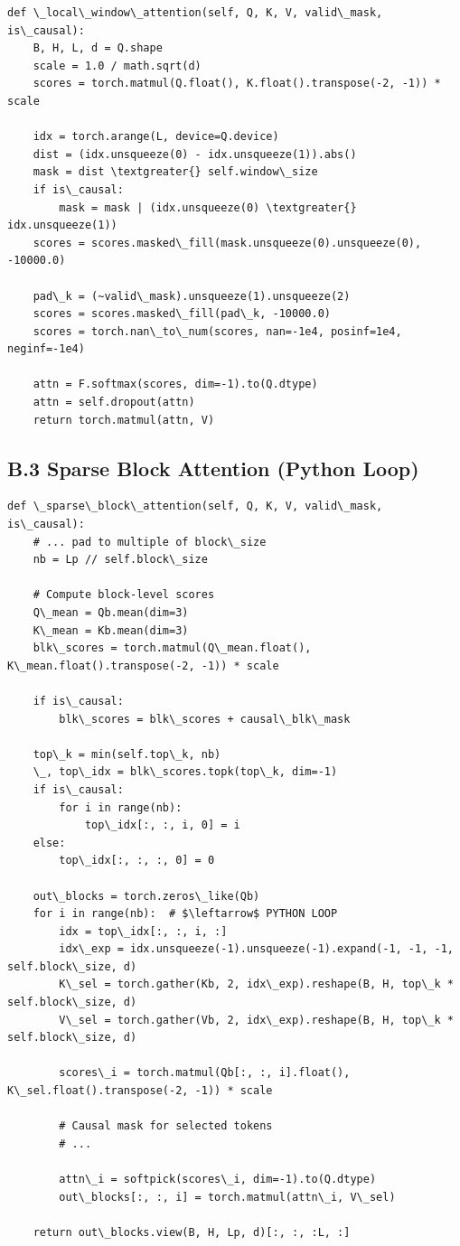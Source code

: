 \begin{lstlisting}
def \_local\_window\_attention(self, Q, K, V, valid\_mask, is\_causal):
    B, H, L, d = Q.shape
    scale = 1.0 / math.sqrt(d)
    scores = torch.matmul(Q.float(), K.float().transpose(-2, -1)) * scale
    
    idx = torch.arange(L, device=Q.device)
    dist = (idx.unsqueeze(0) - idx.unsqueeze(1)).abs()
    mask = dist \textgreater{} self.window\_size
    if is\_causal:
        mask = mask | (idx.unsqueeze(0) \textgreater{} idx.unsqueeze(1))
    scores = scores.masked\_fill(mask.unsqueeze(0).unsqueeze(0), -10000.0)
    
    pad\_k = (~valid\_mask).unsqueeze(1).unsqueeze(2)
    scores = scores.masked\_fill(pad\_k, -10000.0)
    scores = torch.nan\_to\_num(scores, nan=-1e4, posinf=1e4, neginf=-1e4)
    
    attn = F.softmax(scores, dim=-1).to(Q.dtype)
    attn = self.dropout(attn)
    return torch.matmul(attn, V)
\end{lstlisting}

\subsection{B.3 Sparse Block Attention (Python Loop)}

\begin{lstlisting}
def \_sparse\_block\_attention(self, Q, K, V, valid\_mask, is\_causal):
    # ... pad to multiple of block\_size
    nb = Lp // self.block\_size
    
    # Compute block-level scores
    Q\_mean = Qb.mean(dim=3)
    K\_mean = Kb.mean(dim=3)
    blk\_scores = torch.matmul(Q\_mean.float(), K\_mean.float().transpose(-2, -1)) * scale
    
    if is\_causal:
        blk\_scores = blk\_scores + causal\_blk\_mask
    
    top\_k = min(self.top\_k, nb)
    \_, top\_idx = blk\_scores.topk(top\_k, dim=-1)
    if is\_causal:
        for i in range(nb):
            top\_idx[:, :, i, 0] = i
    else:
        top\_idx[:, :, :, 0] = 0
    
    out\_blocks = torch.zeros\_like(Qb)
    for i in range(nb):  # $\leftarrow$ PYTHON LOOP
        idx = top\_idx[:, :, i, :]
        idx\_exp = idx.unsqueeze(-1).unsqueeze(-1).expand(-1, -1, -1, self.block\_size, d)
        K\_sel = torch.gather(Kb, 2, idx\_exp).reshape(B, H, top\_k * self.block\_size, d)
        V\_sel = torch.gather(Vb, 2, idx\_exp).reshape(B, H, top\_k * self.block\_size, d)
        
        scores\_i = torch.matmul(Qb[:, :, i].float(), K\_sel.float().transpose(-2, -1)) * scale
        
        # Causal mask for selected tokens
        # ... 
        
        attn\_i = softpick(scores\_i, dim=-1).to(Q.dtype)
        out\_blocks[:, :, i] = torch.matmul(attn\_i, V\_sel)
    
    return out\_blocks.view(B, H, Lp, d)[:, :, :L, :]
\end{lstlisting}

